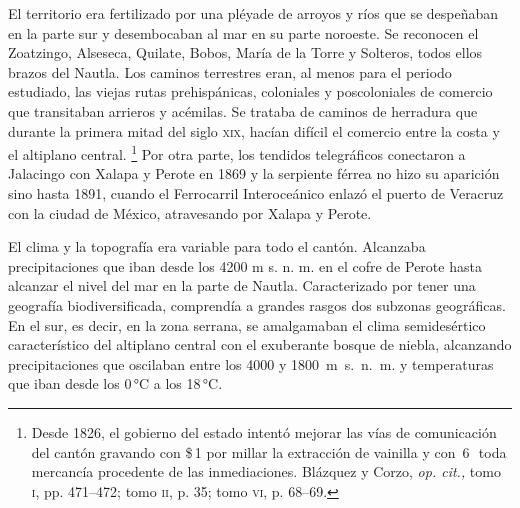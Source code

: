 \documentclass[14pt,twoside,final]{extbook} %
\let\oldfootnote\footnote
\renewcommand\footnote[1]{%
\oldfootnote{\hspace{1mm}#1}}
\begin{document}
El territorio era fertilizado por una pléyade de arroyos y ríos que se despeñaban en la parte sur y desembocaban al mar en su parte noroeste. Se reconocen el Zoatzingo, Alseseca, Quilate, Bobos, María de la Torre y Solteros, todos ellos brazos del Nautla. Los caminos terrestres eran, al menos para el periodo estudiado, las viejas rutas prehispánicas, coloniales y poscoloniales de comercio que transitaban arrieros y acémilas. Se trataba de caminos de herradura que durante la primera mitad del siglo \textsc{xix}, hacían difícil el comercio entre la costa y el altiplano central.\footnote{Desde 1826, el gobierno del estado\index[lugares]{Veracruz!gobierno} intentó mejorar las vías de comunicación del cantón\index[lugares]{Jalacingo!cantón} gravando con \$\,1 por millar la extracción de vainilla y con \textcent\,6\,\textonequarter\ toda mercancía procedente de las inmediaciones. Blázquez y Corzo, \emph{op. cit.,} tomo \textsc{i}, pp. 471--472; tomo \textsc{ii}, p. 35; tomo \textsc{vi}, p. 68--69.} Por otra parte, los tendidos telegráficos conectaron a Jalacingo con Xalapa y Perote en 1869 y la serpiente férrea no hizo su aparición sino hasta 1891, cuando el Ferrocarril Interoceánico enlazó el puerto de Veracruz con la ciudad de México, atravesando por Xalapa y Perote.

El clima y la topografía era variable para todo el cantón. Alcanzaba precipitaciones que iban desde los 4200 m s. n. m. en el cofre de Perote hasta alcanzar el nivel del mar en la parte de Nautla. Caracterizado por tener una geografía biodiversificada, comprendía a grandes rasgos dos subzonas geográficas. En el sur, es decir, en la zona serrana, se amalgamaban el clima semidesértico característico del altiplano central con el exuberante bosque de niebla, alcanzando precipitaciones que oscilaban entre los 4000 y \mbox{1800 m s. n. m.} y temperaturas que iban desde los 0\,°C a los 18\,°C.
\end{document}
